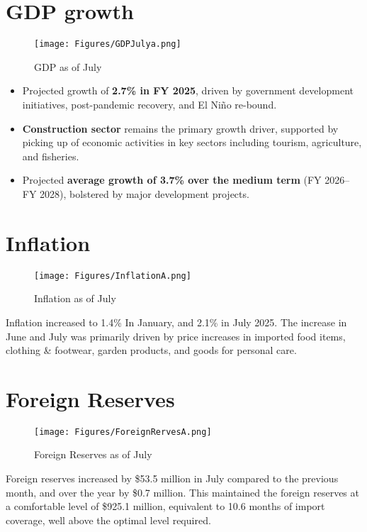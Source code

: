 \documentclass[11pt,a4paper]{setup}
\begin{document}
\section*{GDP growth}
 \begin{figure}[H]
    		\centering
    		\texttt{[image: Figures/GDPJulya.png]}
    		\caption{GDP as of July}
    		\label{fig:figure}
    	\end{figure}
\begin{itemize}
\item Projected growth of \textbf{2.7\% in FY 2025}, driven by government development initiatives, post-pandemic recovery, and El Niño re-bound. 
\item \textbf{Construction sector} remains the primary growth driver, supported by picking up of economic activities in key sectors including tourism, agriculture, and fisheries.
\item Projected \textbf{average growth of 3.7\% over the medium term} (FY 2026–FY 2028), bolstered by major development projects.
\end{itemize}

\twocolumn

\section*{Inflation}
\begin{figure}[H]
    		\centering
    		\texttt{[image: Figures/InflationA.png]}
    		\caption{Inflation as of July}
    		\label{fig:figure}
    	\end{figure}


Inflation increased to 1.4\% In January, and 2.1\% in July 2025.
The increase in June and July was primarily driven by price increases in imported food items, clothing \& footwear, garden products, and goods for personal care. 

\section*{Foreign Reserves}
\begin{figure}[H]
    		\centering
    		\texttt{[image: Figures/ForeignRervesA.png]}
    		\caption{Foreign Reserves as of July}
    		\label{fig:figure}
    	\end{figure}


Foreign reserves increased by \$53.5 million in July compared to the previous month, and over the year by \$0.7 million. This maintained the foreign reserves at a comfortable level of \$925.1 million, equivalent to 10.6 months of import coverage, well above the optimal level required.
\end{document}
